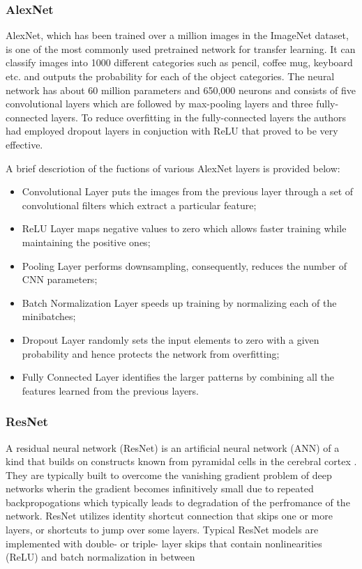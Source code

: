 \documentclass[doc/report.tex]{subfiles}
\begin{document}
\subsubsection{AlexNet}
AlexNet\cite{Alex}, which has been trained over a million images in the
ImageNet dataset, is one of the most commonly used pretrained network for
transfer learning. It can classify images into 1000 different categories such
as pencil, coffee mug, keyboard etc. and outputs the probability for each of
the object categories. The neural network has about 60 million parameters and
650,000 neurons and consists of five convolutional layers which are followed by
max-pooling layers and three fully-connected layers. To reduce overfitting in
the fully-connected layers the authors had  employed dropout layers in
conjuction with ReLU that proved to be very effective.

A brief descriotion of the fuctions of various AlexNet layers is provided
below:

\begin{itemize}
    \item Convolutional Layer puts the images from the previous layer through a
        set of convolutional filters which extract a particular feature;
    \item ReLU Layer maps negative values to zero which allows faster training
        while maintaining the positive ones;
    \item Pooling Layer performs downsampling, consequently, reduces the number
        of CNN parameters;
        \item Batch Normalization Layer speeds up training by normalizing each
            of the minibatches;
        \item Dropout Layer randomly sets the input elements to zero with a
            given probability and hence protects the network from overfitting;
        \item Fully Connected Layer identifies the larger patterns by combining
            all the features learned from the previous layers.
\end{itemize}

\subsubsection{ResNet}
A residual neural network (ResNet) is an artificial neural network (ANN) of a
kind that builds on constructs known from pyramidal cells in the cerebral
cortex \cite{Res}. They are typically built to overcome the vanishing gradient
problem of deep networks wherin the gradient becomes infinitively small due to
repeated backpropogations which typically leads to degradation of the
perfromance of the network. ResNet utilizes identity shortcut connection that
skips one or more layers, or shortcuts to jump over some layers. Typical ResNet
models are implemented with double- or triple- layer skips that contain
nonlinearities (ReLU) and batch normalization in between
\end{document}

